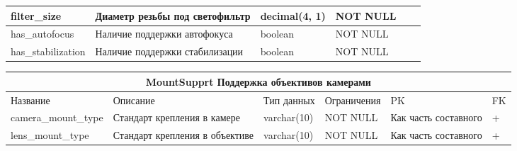 \documentclass{article}
\begin{document}
\begin{tabular}{ |p{4.5cm}|p{4cm}|p{3cm}|p{3cm}|p{2cm}|p{1cm}| }
                                    \\  %
\hline
filter\_size                        &   %
Диаметр резьбы под светофильтр      &   %
decimal(4, 1)                       &   %
NOT NULL                            &   %
                                    &   %
                                    \\  %
\hline
has\_autofocus                      &   %
Наличие поддержки автофокуса        &   %
boolean                             &   %
NOT NULL                            &   %
                                    &   %
                                    \\  %
\hline
has\_stabilization                  &   %
Наличие поддержки стабилизации      &   %
boolean                             &   %
NOT NULL                            &   %
                                    &   %
                                    \\  %
\hline
\end{tabular}

\newpage

\begin{tabular}{ |p{4.5cm}|p{4cm}|p{3cm}|p{3cm}|p{2cm}|p{1cm}| }
\hline
\multicolumn{6}{|c|}{MountSupprt Поддержка объективов камерами} \\
\hline
Название & Описание & Тип данных & Ограничения & PK & FK\\
\hline
camera\_mount\_type                 &   %
Стандарт крепления в камере         &   %
varchar(10)                         &   %
NOT NULL                            &   %
Как часть составного                &   %
 +                                  \\  %
\hline
lens\_mount\_type                   &   %
Стандарт крепления в объективе      &   %
varchar(10)                         &   %
NOT NULL                            &   %
Как часть составного                &   %
 +                                  \\  %
\hline
\end{tabular}
\end{document}
